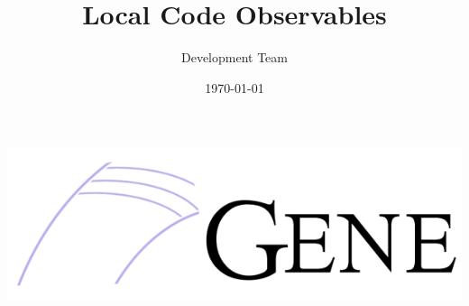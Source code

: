 \documentclass[12pt]{article}
\begin{document}
\title{Local Code Observables}
\vspace{1cm}
\date{\Large \today}
\author{\gene Development Team}

\maketitle

\vspace{2cm}
\begin{center}
\includegraphics[width=\textwidth]{gene_logo2.png}
\end{center}

\thispagestyle{empty}

\newpage
\end{document}
